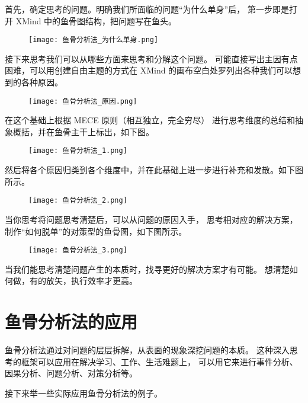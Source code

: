 \documentclass[../main.tex]{subfiles}
\begin{document}
首先，确定思考的问题。明确我们所面临的问题``为什么单身''后，
第一步即是打开 XMind 中的鱼骨图结构，把问题写在鱼头。
%
\begin{figure}[H]
  \begin{center}
    \texttt{[image: 鱼骨分析法\_为什么单身.png]}
  \end{center}
\end{figure}
%
接下来思考我们可以从哪些方面来思考和分解这个问题。
可能直接写出主因有点困难，可以用创建自由主题的方式在
XMind 的画布空白处罗列出各种我们可以想到的各种原因。
%
\begin{figure}[H]
  \begin{center}
    \texttt{[image: 鱼骨分析法\_原因.png]}
  \end{center}
\end{figure}
%
在这个基础上根据 MECE 原则（相互独立，完全穷尽）
进行思考维度的总结和抽象概括，并在鱼骨主干上标出，如下图。
%
\begin{figure}[H]
  \begin{center}
    \texttt{[image: 鱼骨分析法\_1.png]}
  \end{center}
\end{figure}
%
然后将各个原因归类到各个维度中，并在此基础上进一步进行补充和发散。如下图所示。
%
\begin{figure}[H]
  \begin{center}
    \texttt{[image: 鱼骨分析法\_2.png]}
  \end{center}
\end{figure}
%
当你思考将问题思考清楚后，可以从问题的原因入手，
思考相对应的解决方案，制作``如何脱单''的对策型的鱼骨图，如下图所示。
%
\begin{figure}[H]
  \begin{center}
    \texttt{[image: 鱼骨分析法\_3.png]}
  \end{center}
\end{figure}
%
当我们能思考清楚问题产生的本质时，找寻更好的解决方案才有可能。
想清楚如何做，有的放矢，执行效率才更高。
%
\section{鱼骨分析法的应用}
鱼骨分析法通过对问题的层层拆解，从表面的现象深挖问题的本质。
这种深入思考的框架可以应用在解决学习、工作、生活难题上，
可以用它来进行事件分析、因果分析、问题分析、对策分析等。

接下来举一些实际应用鱼骨分析法的例子。
%
\end{document}
